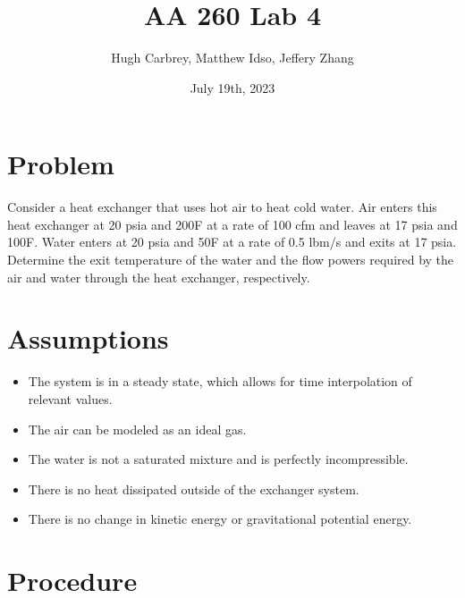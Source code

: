 \documentclass{article}
\title{\textbf{AA 260 Lab 4}}
\author{Hugh Carbrey, Matthew Idso, Jeffery Zhang}
\date{July 19th, 2023}
\begin{document}
\maketitle

\section{Problem}
Consider a heat exchanger that uses hot air to heat cold water. Air enters this heat exchanger at 20 psia and 200\textdegree F at a rate of 100 cfm and leaves at 17 psia and 100\textdegree F. Water enters at 20 psia and 50\textdegree F at a rate of 0.5 lbm/s and exits at 17 psia. Determine the exit temperature of the water and the flow powers required by the air and water through the heat exchanger, respectively.

\section{Assumptions}
\begin{itemize}
    \item The system is in a steady state, which allows for time interpolation of relevant values.
    \item The air can be modeled as an ideal gas.
    \item The water is not a saturated mixture and is perfectly incompressible.
    \item There is no heat dissipated outside of the exchanger system.
    \item There is no change in kinetic energy or gravitational potential energy.
\end{itemize}

\section{Procedure}
\end{document}
